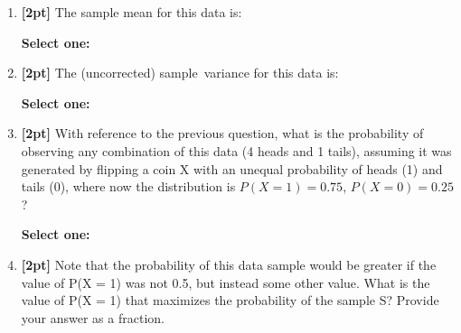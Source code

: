 \documentclass[12pt]{article}
\renewcommand{\circle}{\tikz\draw[black] (0,0) circle (1ex);}
\begin{document}
\begin{enumerate}
    \item \textbf{[2pt]} The sample mean for this data is:
    
    \textbf{Select one:}


    \item \textbf{[2pt]} The (uncorrected) sample variance for this data is:

    \textbf{Select one:}


    \item \textbf{[2pt]} With reference to the previous question, what is the probability of observing any combination of this data (4 heads and 1 tails), assuming it was generated by flipping a coin X with an unequal probability of heads (1) and tails (0), where now the distribution is $P(X = 1) = 0.75$, $P(X = 0) = 0.25$?

    \textbf{Select one:}


    \item \textbf{[2pt]} Note that the probability of this data sample would be greater if the value of P(X = 1) was not 0.5, but instead some other value. What is the value of P(X = 1) that maximizes the probability of the sample S? Provide your answer as a fraction.
    

\end{enumerate}
\end{document}
